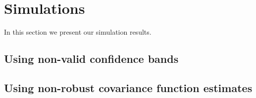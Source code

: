 \section{Simulations}

In this section we present our simulation results.

\subsection{Using non-valid confidence bands}

\subsection{Using non-robust covariance function estimates}
